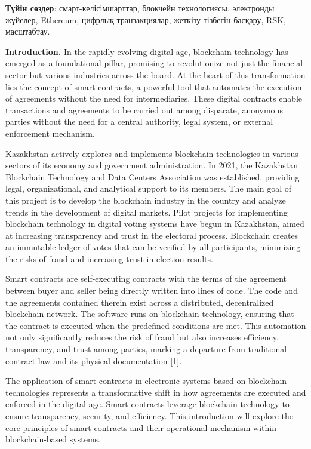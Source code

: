 {\bfseries Түйін сөздер}: смарт-келісімшарттар, блокчейн технологиясы,
электронды жүйелер, Ethereum, цифрлық транзакциялар, жеткізу тізбегін
басқару, RSK, масштабтау.

\begin{multicols}{2}
{\bfseries Introduction.} In the rapidly evolving digital age, blockchain
technology has emerged as a foundational pillar, promising to
revolutionize not just the financial sector but various industries
across the board. At the heart of this transformation lies the concept
of smart contracts, a powerful tool that automates the execution of
agreements without the need for intermediaries. These digital contracts
enable transactions and agreements to be carried out among disparate,
anonymous parties without the need for a central authority, legal
system, or external enforcement mechanism.

Kazakhstan actively explores and implements blockchain technologies in
various sectors of its economy and government administration. In 2021,
the Kazakhstan Blockchain Technology and Data Centers Association was
established, providing legal, organizational, and analytical support to
its members. The main goal of this project is to develop the blockchain
industry in the country and analyze trends in the development of digital
markets. Pilot projects for implementing blockchain technology in
digital voting systems have begun in Kazakhstan, aimed at increasing
transparency and trust in the electoral process. Blockchain creates an
immutable ledger of votes that can be verified by all participants,
minimizing the risks of fraud and increasing trust in election results.

Smart contracts are self-executing contracts with the terms of the
agreement between buyer and seller being directly written into lines of
code. The code and the agreements contained therein exist across a
distributed, decentralized blockchain network. The software runs on
blockchain technology, ensuring that the contract is executed when the
predefined conditions are met. This automation not only significantly
reduces the risk of fraud but also increases efficiency, transparency,
and trust among parties, marking a departure from traditional contract
law and its physical documentation {[}1{]}.

The application of smart contracts in electronic systems based on
blockchain technologies represents a transformative shift in how
agreements are executed and enforced in the digital age. Smart contracts
leverage blockchain technology to ensure transparency, security, and
efficiency. This introduction will explore the core principles of smart
contracts and their operational mechanism within blockchain-based
systems.


\end{multicols}
